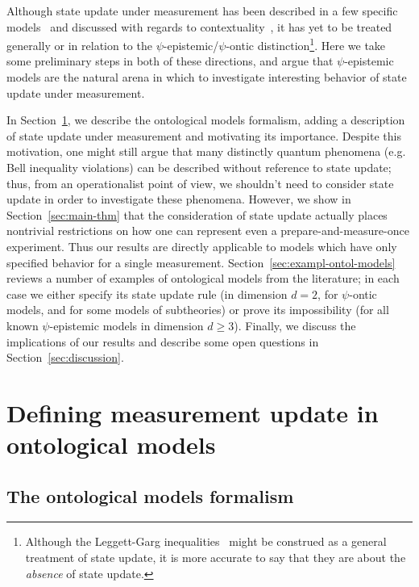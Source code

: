 \documentclass[%
 reprint,
superscriptaddress,
nofootinbib,
 amsmath,amssymb,
 prx, 
 accepted=2019-09-27,
]{quantumarticle}
\begin{document}
Although state update under measurement has been described in a few
specific
models~\cite{MontinaDynamicsqubitclassical2012,Spekkensdefenseepistemicview2007,CataniSpekkenstoymodel2017,LillystoneContextualpsEpistemicModel2019}
and discussed with regards to
contextuality~\cite{KaranjaiContextualityboundsefficiency2018}, it has
yet to be treated generally or in relation to the
$\psi$-epistemic/$\psi$-ontic distinction\footnote{Although the
  Leggett-Garg
  inequalities~\cite{LeggettQuantummechanicsmacroscopic1985,EmaryLeggettGargInequalities2014}
  might be construed as a general treatment of state update, it is
  more accurate to say that they are about the \emph{absence} of state
  update.}. Here we take some preliminary steps in both of these
directions, and argue that $\psi$-epistemic models are the natural
arena in which to investigate interesting behavior of state update
under measurement.


In Section~\ref{sec:defin-meas-update}, we describe the ontological
models formalism, adding a description of state update under
measurement and motivating its importance. Despite this motivation,
one might still argue that many distinctly quantum phenomena
(e.g. Bell inequality violations) can be described without reference
to state update; thus, from an operationalist point of view, we
shouldn't need to consider state update in order to investigate these
phenomena.  However, we show in Section~\ref{sec:main-thm} that the
consideration of state update actually places nontrivial restrictions
on how one can represent even a prepare-and-measure-once
experiment. Thus our results are directly applicable to models which
have only specified behavior for a single
measurement. Section~\ref{sec:exampl-ontol-models} reviews a number of
examples of ontological models from the literature; in each case we
either specify its state update rule (in dimension $d=2$, for
$\psi$-ontic models, and for some models of subtheories) or prove its
impossibility (for all known $\psi$-epistemic models in dimension
$d\geq3$). Finally, we discuss the implications of our results and
describe some open questions in Section~\ref{sec:discussion}.


 
\section{Defining measurement update in ontological models}
\label{sec:defin-meas-update}

\subsection{The ontological models formalism}
\label{sec:ont-models}
\end{document}

